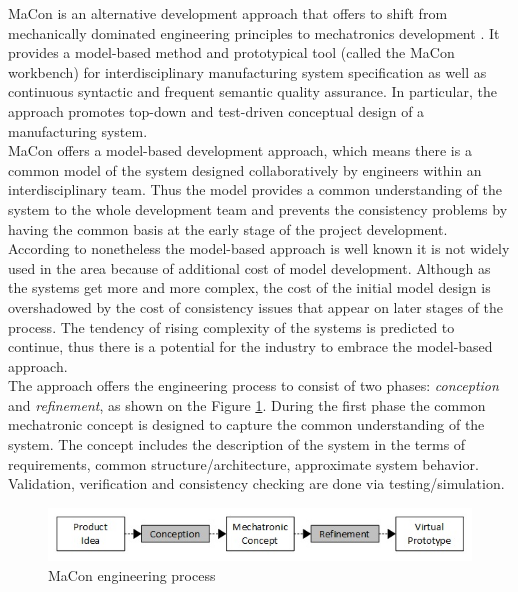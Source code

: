 MaCon is an alternative development approach that offers to shift from mechanically dominated engineering principles to mechatronics development \cite{dese}. It provides a model-based method and prototypical tool (called the MaCon workbench) for interdisciplinary manufacturing system specification as well as continuous syntactic and frequent semantic quality assurance. In particular, the approach promotes top-down and test-driven conceptual design of a manufacturing system.\\

MaCon offers a model-based development approach, which means there is a common model of the system designed collaboratively by engineers within an interdisciplinary team. Thus the model provides a common understanding of the system to the whole development team and prevents the consistency problems by having the common basis at the early stage of the project development.\\

According to \cite{Hackenberg2016} nonetheless the model-based approach is well known it is not widely used in the area because of additional cost of model development. Although as the systems get more and more complex, the cost of the initial model design is overshadowed by the cost of consistency issues that appear on later stages of the process. The tendency of rising complexity of the systems is predicted to continue, thus there is a potential for the industry to embrace the model-based approach.\\ 

The approach offers the engineering process to consist of two phases: \textit{conception} and \textit{refinement}, as shown on the Figure \ref{fig:phases}.  During the first phase the common mechatronic concept is designed to capture the common understanding of the system. The concept includes the description of the system in the terms of requirements, common structure/architecture, approximate system behavior. Validation, verification and consistency checking are done via testing/simulation. \\

 \begin{figure}[htb]
\includegraphics{figures/phases.jpg}
\caption{MaCon engineering process}
\label{fig:phases}
 \end{figure}
 
